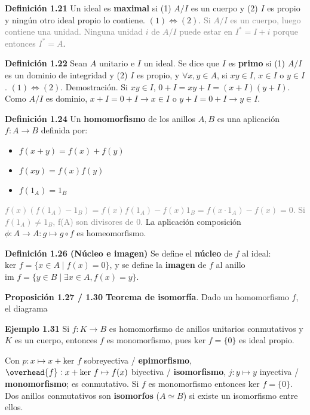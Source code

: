 \documentclass[a4paper, 11pt]{extarticle}
\newcommand{\propo}[1]{\textcolor{rojo}{\textbf{Proposición #1}}}
\newcommand{\defi}[1]{\textcolor{azul}{\textbf{Definición #1}}}
\newcommand{\ejem}[1]{\textcolor{verde}{\textbf{Ejemplo #1}}}
\newcommand{\dem}[1]{\textcolor{gris}{\small{Demostración. #1}}}
\begin{document}
\begin{multicols*}{2}
\defi{1.21} Un ideal es \textbf{maximal} si (1) \(A/I\) es un cuerpo y (2) \(I\) es
propio y ningún otro ideal propio lo contiene. \((1) \iff (2)\).
\textcolor{gray}{\footnotesize Si \( A/I  \) es
un cuerpo, luego contiene una unidad. Ninguna unidad \( i \) de \( A/I  \) puede estar
en \( I^* = I + i \) porque entonces \( I^* = A \)}.

\defi{1.22} Sean \(A\) unitario e \(I\) un ideal. Se dice que \(I\) es
\textbf{primo} si (1) \(A/I\) es un dominio de integridad y (2) \(I\) es propio, y
\(\forall x,y \in A\), si \(xy \in I\), \(x \in I\) o \(y \in I\). \((1) \iff (2)\).
\dem{ Si \( xy \in I  \), \( 0 + I = xy + I = (x+I)(y+I) \). Como \( A/I  \) es dominio, 
\( x+I = 0 + I \rightarrow x \in I \) o \( y+I = 0 + I \rightarrow y \in I  \).  }

\defi{1.24} Un \textbf{homomorfismo} de los anillos \(A,B\) es una aplicación \(f: A
\rightarrow B\) definida por: \vspace{-1em}
\begin{itemize}
\item \(f(x+y) = f(x) + f(y)\)
\item \(f(xy) = f(x)f(y)\)
\item \(f(1_A) = 1_B\)
\end{itemize}
\vspace{-1em}\textcolor{gray}{\footnotesize \( f(x) (f(1_A) - 1_B) = f(x)f(1_A) - f(x)1_B = f(x\cdot 1_A) - f(x) = 0 \). 
Si \( f(1_A) \neq 1_B \), f(A) son divisores de 0.}
La aplicación composición \(\phi: A \rightarrow A: g \mapsto g \circ f\) es
homeomorfismo. 

\defi{1.26 (Núcleo e imagen)} Se define el \textbf{núcleo} de \(f\) al ideal: \(\text{ker } f
= \{ x \in A \;|\; f(x) = 0 \}\), y se define la \textbf{imagen} de \(f\) al anillo \(\text{im } f = \{ y \in B \;|\; \exists x \in A, f(x) = y \}\).

\propo{1.27 / 1.30} \textbf{Teorema de isomorfía}. Dado un homomorfismo \(f\), el diagrama

\ejem{1.31} Si \(f: K \rightarrow  B\) es homomorfismo de anillos unitarios
conmutativos y \(K\) es un cuerpo, entonces \(f\) es monomorfismo, pues \(\text{ker } f = \{ 0 \}\) es ideal propio.
\vspace{-1em}
\begin{center}
\end{center}
\vspace{-1em}
Con \(p: x \mapsto x + \text{ker }f\) sobreyectiva / \textbf{epimorfismo}, \(\overhead{f}: x +
\text{ker }f \mapsto f(x)\) biyectiva / \textbf{isomorfismo}, \(j: y \mapsto y\)
inyectiva / \textbf{monomorfismo}; es
conmutativo.  
Si \(f\) es monomorfismo entonces \(\text{ker }f = \{ 0 \}\). Dos anillos
conmutativos son \textbf{isomorfos} (\(A \simeq B\)) si existe un isomorfismo entre
ellos.
\vspace{-1.5em}

\end{multicols*}
\end{document}

